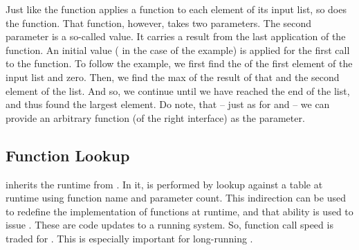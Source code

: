Just like the  function applies a function to each element of its input list, so does the  function. That function, however, takes two parameters. The second parameter is a so-called  value. It carries a result from the last application of the function. An initial value ( in the case of the example) is applied for the first call to the  function. To follow the example, we first find the  of the first element of the input list and zero. Then, we find the max of the result of that and the second element of the list. And so, we continue until we have reached the end of the list, and thus found the largest element. Do note, that -- just as for  and  -- we can provide an arbitrary function (of the right interface) as the parameter.

\subsection{Function Lookup}

 inherits the  runtime from . In it,  is performed by lookup against a table at runtime using function name and parameter count. This indirection can be used to redefine the implementation of functions at runtime, and that ability is used to issue . These are code updates to a running system. So, function call speed is traded for . This is especially important for long-running .

